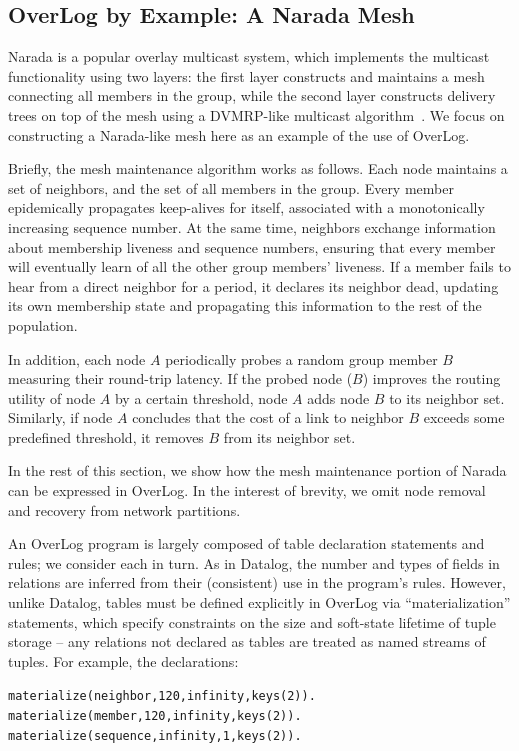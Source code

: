 \documentclass{sig-alt-full}
\def\Lang{OverLog\xspace}
\newenvironment{overlog}{\begin{alltt}\small}{\end{alltt}}
\begin{document}
\subsection{\Lang by Example: A Narada Mesh}
\label{sec:lang-narada}
Narada is a popular overlay multicast system, which implements the
multicast functionality using two layers: the first layer constructs and
maintains a mesh connecting all members in the group, while the second
layer constructs delivery trees on top of the mesh using a
DVMRP-like multicast algorithm~\cite{dvmrp}.  We focus on
constructing a Narada-like mesh here as an example of the use of \Lang.

Briefly, the mesh maintenance algorithm works as follows. Each node
maintains a set of neighbors, and the set of all members in the
group. Every member epidemically propagates keep-alives for itself,
associated with a monotonically increasing sequence number. At the same
time, neighbors exchange information about membership liveness and
sequence numbers, ensuring that every member will eventually learn of
all the other group members' liveness.  If a member fails to hear from a
direct neighbor for a period, it declares its neighbor dead, updating its
own membership state and propagating this information to the rest of the
population.

In addition, each node $A$ periodically probes a random group member $B$
measuring their round-trip latency. If the probed node ($B$) improves
the routing utility of node $A$ by a certain threshold, node $A$ adds
node $B$ to its neighbor set.  Similarly, if node $A$ concludes that the
cost of a link to neighbor $B$ exceeds some predefined threshold, it
removes $B$ from its neighbor set.

In the rest of this section, we show how the mesh maintenance portion
of Narada can be expressed in \Lang.  In the interest of brevity, we
omit node removal and recovery from network partitions.

An \Lang program is largely composed of table declaration statements and
rules; we consider each in turn.  As in Datalog, the number and types
of fields in relations are inferred from their (consistent) use in the
program's rules.  However, unlike Datalog, tables must be defined
explicitly in \Lang via ``materialization'' statements, which specify
constraints on the size and soft-state lifetime of tuple storage -- any
relations not declared as tables are treated as named streams of
tuples. For example, the declarations:

\begin{overlog}
materialize(neighbor, 120, infinity, keys(2)).
materialize(member, 120, infinity, keys(2)).
materialize(sequence, infinity, 1, keys(2)).
\end{overlog}
\end{document}
